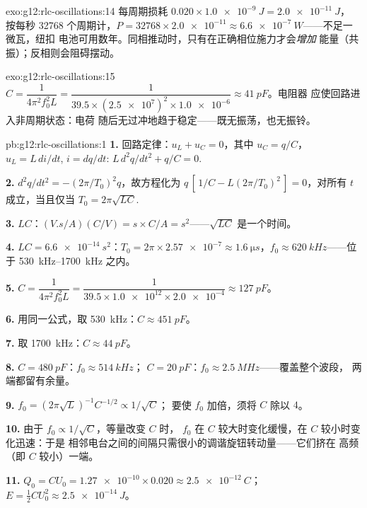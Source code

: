 \begin{solution}{exo:g12:rlc-oscillations:14}
每周期损耗 $0.020 \times \qty{1.0e-9}{J} = \qty{2.0e-11}{J}$，
按每秒 \num{32768} 个周期计，$P = \num{32768} \times \num{2.0e-11}
\approx \qty{6.6e-7}{W}$——不足一微瓦，纽扣
电池可用数年。同相推动时，只有在正确相位施力才会\emph{增加}
能量（共振）；反相则会阻碍摆动。
\end{solution}

\begin{solution}{exo:g12:rlc-oscillations:15}
$C = \dfrac{1}{4\pi^2 f_0^2 L} = \dfrac{1}{39.5 \times
(\num{2.5e7})^2 \times \num{1.0e-6}} \approx \qty{41}{pF}$。电阻器
应使回路进入非周期状态：电荷
随后无过冲地趋于稳定——既无振荡，也无振铃。
\end{solution}

\begin{solution}{pb:g12:rlc-oscillations:1}
\textbf{1.} 回路定律：$u_L + u_C = 0$，其中 $u_C = q/C$，
$u_L = L\,di/dt$, $i = dq/dt$: $L\,d^2q/dt^2 + q/C = 0$.

\textbf{2.} $d^2q/dt^2 = -(2\pi/T_0)^2 q$，故方程化为
$q\,[\,1/C - L(2\pi/T_0)^2\,] = 0$，对所有 $t$ 成立，当且仅当
$T_0 = 2\pi\sqrt{LC}$.

\textbf{3.} $LC$：$(\unit{V.s/A})(\unit{C/V}) = \unit{s} \times
\unit{C/A} = \unit{s^2}$——$\sqrt{LC}$ 是一个时间。

\textbf{4.} $LC = \qty{6.6e-14}{s^2}$：$T_0 = 2\pi \times \num{2.57e-7}
\approx \qty{1.6}{\micro s}$，$f_0 \approx \qty{620}{kHz}$——位于
\qtyrange{530}{1700}{kHz} 之内。

\textbf{5.} $C = \dfrac{1}{4\pi^2 f_0^2 L} = \dfrac{1}{39.5 \times
\num{1.0e12} \times \num{2.0e-4}} \approx \qty{127}{pF}$。

\textbf{6.} 用同一公式，取 \qty{530}{kHz}：$C \approx \qty{451}{pF}$。

\textbf{7.} 取 \qty{1700}{kHz}：$C \approx \qty{44}{pF}$。

\textbf{8.} $C = \qty{480}{pF}$：$f_0 \approx \qty{514}{kHz}$；
$C = \qty{20}{pF}$：$f_0 \approx \qty{2.5}{MHz}$——覆盖整个波段，
两端都留有余量。

\textbf{9.} $f_0 = (2\pi\sqrt{L})^{-1}C^{-1/2} \propto 1/\sqrt{C}$；
要使 $f_0$ 加倍，须将 $C$ 除以 $4$。

\textbf{10.} 由于 $f_0 \propto 1/\sqrt{C}$，等量改变 $C$ 时，
$f_0$ 在 $C$ 较大时变化缓慢，在 $C$ 较小时变化迅速：于是
相邻电台之间的间隔只需很小的调谐旋钮转动量——它们挤在
高频（即 $C$ 较小）一端。

\textbf{11.} $Q_0 = CU_0 = \num{1.27e-10} \times 0.020 \approx
\qty{2.5e-12}{C}$；$E = \tfrac12 CU_0^2 \approx \qty{2.5e-14}{J}$。


\end{solution}
